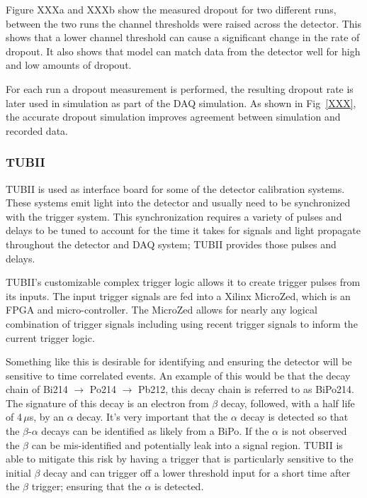 Figure XXXa and XXXb show the measured dropout for two different runs, between
the two runs the channel thresholds were raised across the detector. This shows
that a lower channel threshold can cause a significant change in the rate of
dropout. It also shows that model can match data from the detector well for high
and low amounts of dropout.

For each run a dropout measurement is performed, the resulting dropout rate
is later used in simulation as part of the DAQ simulation.
As shown in Fig~\ref{XXX}, the accurate dropout simulation improves agreement between simulation and recorded
data.


\subsubsection{TUBII}
\label{sec:tubii}
TUBII is used as interface board for some of the detector calibration systems.
These systems emit light into the detector and usually need to be
synchronized with the trigger system. This synchronization requires
a variety of pulses and delays to be tuned to account for the time it
takes for signals and light propagate throughout the detector and DAQ
system; TUBII provides those pulses and delays.

TUBII's customizable complex trigger logic
allows it to create trigger pulses from its inputs.
The input trigger signals are fed into a Xilinx MicroZed, which is an FPGA and
micro-controller.
The MicroZed allows for nearly any logical combination of trigger signals including
using recent trigger signals to inform the current trigger logic.

Something like this is desirable for identifying and ensuring the detector will
be sensitive to time correlated events. An example of this would be that
the decay chain of Bi214 $\rightarrow$ Po214 $\rightarrow$ Pb212, this decay chain is referred to as BiPo214. %
The signature of this decay is an electron from $\beta$ decay, followed, with a half
life of 4\,$\mu$s, by an $\alpha$ decay.
It's very important that the $\alpha$ decay is detected so that the $\beta$-$\alpha$
decays can be identified as likely from a BiPo. If the $\alpha$ is not observed
the $\beta$ can be mis-identified and potentially leak into a signal region.
TUBII is able to mitigate this risk by having a trigger that is particularly
sensitive to the initial $\beta$ decay and can trigger off a lower
threshold input for a short time after the $\beta$ trigger; ensuring that
the $\alpha$ is detected.

